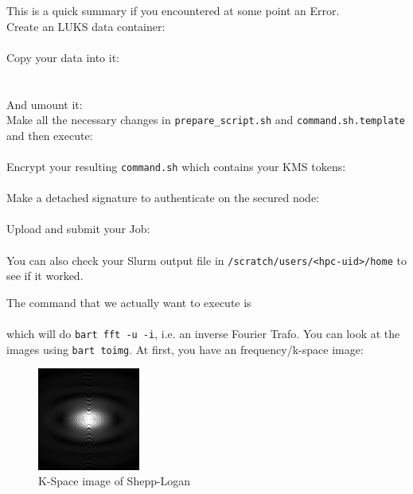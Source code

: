 \documentclass[paper=a4]{scrartcl}
\begin{document}
This is a quick summary if you encountered at some point an Error.\\
Create an LUKS data container:\\
 \\
Copy your data into it:\\
 \\
\\
And umount it:
\\
Make all the necessary changes in \texttt{prepare\_script.sh} and \texttt{command.sh.template} and then execute:\\
\\
Encrypt your resulting \texttt{command.sh} which contains your KMS tokens:\\
 \\
Make a detached signature to authenticate on the secured node: \\
 \\
Upload and submit your Job:
\\
\\
You can also check your Slurm output file in \texttt{/scratch/users/<hpc-uid>/home} to see if it worked.

The command that we actually want to execute is \\
 \\
which will do \texttt{bart fft -u -i}, i.e. an inverse Fourier Trafo.
You can look at the images using \texttt{bart toimg}.
At first, you have an frequency/k-space image:

\begin{figure}[!ht]
    \centerline{\includegraphics[width=0.3\textwidth]{kraum.png}}
    \caption{K-Space image of Shepp-Logan}
    \label{fig:kraum}
\end{figure}
\end{document}
